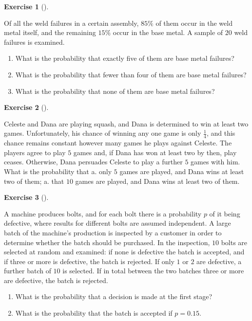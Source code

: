 \documentclass[
  letterpaper,
  DIV=11,
  numbers=noendperiod]{scrreprt}
\providecommand{\tightlist}{%
  \setlength{\itemsep}{0pt}\setlength{\parskip}{0pt}}\usepackage{longtable,booktabs,array}
\theoremstyle{definition}
\newtheorem{exercise}{Exercise}[chapter]
\theoremstyle{definition}
\theoremstyle{definition}
\theoremstyle{remark}
\begin{document}
\begin{exercise}[]\protect\hypertarget{exr-8.6}{}\label{exr-8.6}

Of all the weld failures in a certain assembly, \(85\%\) of them occur
in the weld metal itself, and the remaining \(15\%\) occur in the base
metal. A sample of \(20\) weld failures is examined.

\begin{enumerate}
\def\labelenumi{\alph{enumi}.}
\tightlist
\item
  What is the probability that exactly five of them are base metal
  failures?
\item
  What is the probability that fewer than four of them are base metal
  failures?
\item
  What is the probability that none of them are base metal failures?
\end{enumerate}

\end{exercise}

\begin{exercise}[]\protect\hypertarget{exr-8.7}{}\label{exr-8.7}

Celeste and Dana are playing squash, and Dana is determined to win at
least two games. Unfortunately, his chance of winning any one game is
only \(\frac{1}{4}\), and this chance remains constant however many
games he plays against Celeste. The players agree to play \(5\) games
and, if Dana has won at least two by then, play ceases. Otherwise, Dana
persuades Celeste to play a further \(5\) games with him. What is the
probability that a. only \(5\) games are played, and Dana wins at least
two of them; a. that \(10\) games are played, and Dana wins at least two
of them.

\end{exercise}

\begin{exercise}[]\protect\hypertarget{exr-8.8}{}\label{exr-8.8}

A machine produces bolts, and for each bolt there is a probability \(p\)
of it being defective, where results for different bolts are assumed
independent. A large batch of the machine's production is inspected by a
customer in order to determine whether the batch should be purchased. In
the inspection, \(10\) bolts are selected at random and examined: if
none is defective the batch is accepted, and if three or more is
defective, the batch is rejected. If only \(1\) or \(2\) are defective,
a further batch of \(10\) is selected. If in total between the two
batches three or more are defective, the batch is rejected.

\begin{enumerate}
\def\labelenumi{\alph{enumi}.}
\tightlist
\item
  What is the probability that a decision is made at the first stage?
\item
  What is the probability that the batch is accepted if \(p=0.15\).
\end{enumerate}

\end{exercise}
\end{document}
